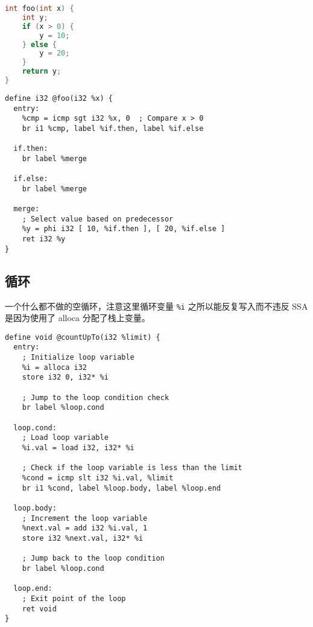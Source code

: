 \begin{lstlisting}[language=cpp]
int foo(int x) {
    int y;
    if (x > 0) {
        y = 10;
    } else {
        y = 20;
    }
    return y;
}
\end{lstlisting}

\begin{lstlisting}[language=none]
define i32 @foo(i32 %x) {
  entry:
    %cmp = icmp sgt i32 %x, 0  ; Compare x > 0
    br i1 %cmp, label %if.then, label %if.else

  if.then:
    br label %merge

  if.else:
    br label %merge

  merge:
    ; Select value based on predecessor
    %y = phi i32 [ 10, %if.then ], [ 20, %if.else ]
    ret i32 %y
}
\end{lstlisting}


\subsection{循环}
一个什么都不做的空循环，注意这里循环变量 \verb`%i` 之所以能反复写入而不违反 SSA 是因为使用了 alloca 分配了栈上变量。
\begin{lstlisting}[language=none]
define void @countUpTo(i32 %limit) {
  entry:
    ; Initialize loop variable
    %i = alloca i32
    store i32 0, i32* %i

    ; Jump to the loop condition check
    br label %loop.cond

  loop.cond:
    ; Load loop variable
    %i.val = load i32, i32* %i

    ; Check if the loop variable is less than the limit
    %cond = icmp slt i32 %i.val, %limit
    br i1 %cond, label %loop.body, label %loop.end

  loop.body:
    ; Increment the loop variable
    %next.val = add i32 %i.val, 1
    store i32 %next.val, i32* %i

    ; Jump back to the loop condition
    br label %loop.cond

  loop.end:
    ; Exit point of the loop
    ret void
}
\end{lstlisting}

